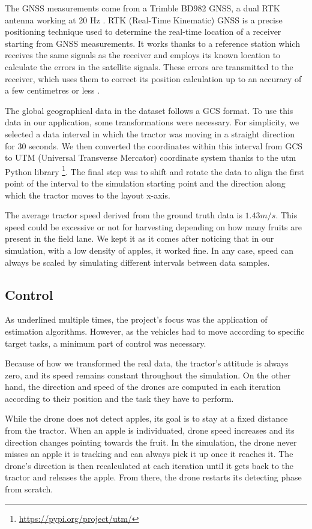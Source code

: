 \documentclass[letterpaper,twocolumn,10pt]{article}
\begin{document}
The GNSS measurements come from a Trimble BD982 GNSS, a dual RTK antenna working at 20 Hz \cite{trimble}.  
RTK (Real-Time Kinematic) GNSS is a precise positioning technique used to determine the real-time location of a receiver starting from GNSS measurements. It works thanks to a reference station which receives the same signals as the receiver and employs its known location to calculate the errors in the satellite signals. These errors are transmitted to the receiver, which uses them to correct its position calculation up to an accuracy of a few centimetres or less \cite{wasoft}. 


The global geographical data in the dataset follows a GCS format. To use this data in our application, some transformations were necessary. 
For simplicity, we selected a data interval in which the tractor was moving in a straight direction for 30 seconds. We then converted the coordinates within this interval from GCS to UTM (Universal Transverse Mercator) coordinate system thanks to the utm Python library \footnote{\url{https://pypi.org/project/utm/}}. The final step was to shift and rotate the data to align the first point of the interval to the simulation starting point and the direction along which the tractor moves to the layout x-axis.

The average tractor speed derived from the ground truth data is $1.43 m/s$. This speed could be excessive or not for harvesting depending on how many fruits are present in the field lane. We kept it as it comes after noticing that in our simulation, with a low density of apples, it worked fine. In any case, speed can always be scaled by simulating different intervals between data samples.

\subsection*{Control}
As underlined multiple times, the project's focus was the application of estimation algorithms. However, as the vehicles had to move according to specific target tasks, a minimum part of control was necessary.

Because of how we transformed the real data, the tractor's attitude is always zero, and its speed remains constant throughout the simulation. On the other hand, the direction and speed of the drones are computed in each iteration according to their position and the task they have to perform. 
 
While the drone does not detect apples, its goal is to stay at a fixed distance from the tractor. When an apple is individuated, drone speed increases and its direction changes pointing towards the fruit. In the simulation, the drone never misses an apple it is tracking and can always pick it up once it reaches it.
The drone's direction is then recalculated at each iteration until it gets back to the tractor and releases the apple. From there, the drone restarts its detecting phase from scratch.
\end{document}
